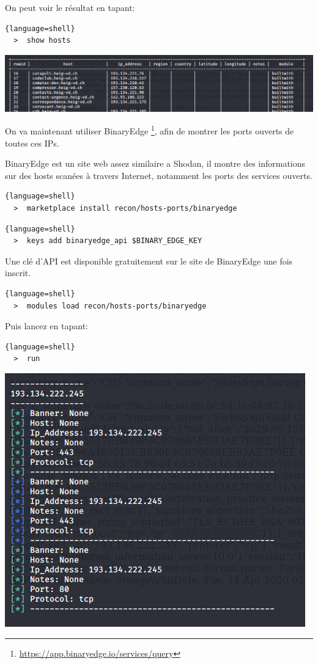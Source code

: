 On peut voir le résultat en tapant:

\begin{lstlisting}{language=shell}
  >  show hosts
\end{lstlisting}

\includegraphics[scale=0.48]{images/SEN_Projet_Image022.png}

On va maintenant utiliser BinaryEdge \footnote{\url{https://app.binaryedge.io/services/query}}, afin de montrer les ports ouverts de toutes ces IPs.

BinaryEdge est un site web assez similaire a Shodan, il montre des informations sur des hosts scanées à travers
Internet, notamment les ports des services ouverts.

\begin{lstlisting}{language=shell}
  >  marketplace install recon/hosts-ports/binaryedge
\end{lstlisting}

\begin{lstlisting}{language=shell}
  >  keys add binaryedge_api $BINARY_EDGE_KEY
\end{lstlisting}

Une clé d'API est disponible gratuitement sur le site de BinaryEdge une fois inscrit.

\begin{lstlisting}{language=shell}
  >  modules load recon/hosts-ports/binaryedge
\end{lstlisting}

Puis lancez en tapant:

\begin{lstlisting}{language=shell}
  >  run
\end{lstlisting}

\includegraphics[scale=0.48]{images/SEN_Projet_Image023.png}

